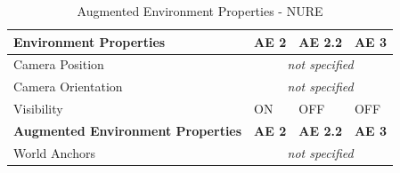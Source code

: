 \begin{table}[h]
\centering
\begin{tabular}{|l|l|l|l|}
\hline
\textbf{Environment Properties}           & \textbf{AE 2} & \textbf{AE 2.2} & \textbf{AE 3} \\ \hline
Camera Position    & \multicolumn{3}{c|}{\textit{not specified}} \\ \hline
Camera Orientation & \multicolumn{3}{c|}{\textit{not specified}} \\ \hline
Visibility         & ON           & OFF           & OFF          \\ \hline
\textbf{Augmented Environment Properties} & \textbf{AE 2} & \textbf{AE 2.2} & \textbf{AE 3} \\ \hline
World Anchors      & \multicolumn{3}{c|}{\textit{not specified}} \\ \hline
\end{tabular}
\caption{Augmented Environment Properties - NURE}
\label{tab:NUREAEproperties}
\end{table}
    
